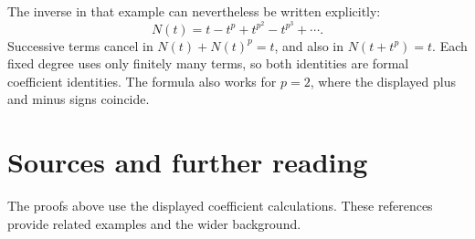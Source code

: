 \documentclass[11pt,letterpaper]{article}
\numberwithin{equation}{section}
\theoremstyle{definition}\newtheorem{example}[theorem]{Example}
\begin{document}
The inverse in that example can nevertheless be written explicitly:
\[
 N(t)=t-t^p+t^{p^2}-t^{p^3}+\cdots.
\]
Successive terms cancel in \(N(t)+N(t)^p=t\), and also in \(N(t+t^p)=t\). Each fixed degree uses only finitely many terms, so both identities are formal coefficient identities. The formula also works for \(p=2\), where the displayed plus and minus signs coincide.



\clearpage
\section*{Sources and further reading}

The proofs above use the displayed coefficient calculations. These references provide related examples and the wider background.
\end{document}
